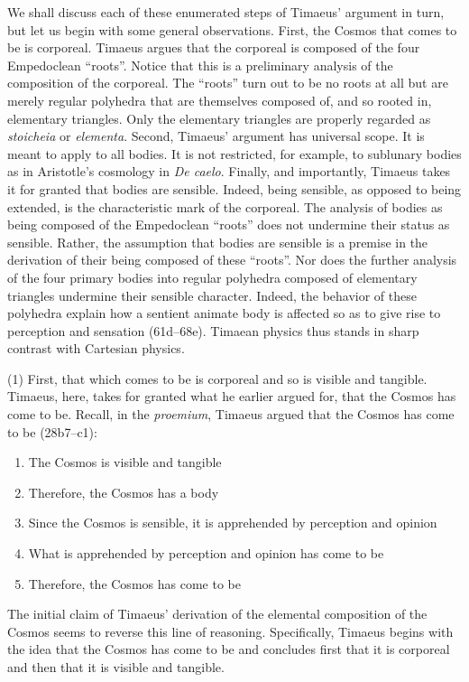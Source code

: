 We shall discuss each of these enumerated steps of Timaeus' argument in turn, but let us begin with some general observations. First, the Cosmos that comes to be is corporeal. Timaeus argues that the corporeal is composed of the four Empedoclean ``roots''. Notice that this is a preliminary analysis of the composition of the corporeal. The ``roots'' turn out to be no roots at all but are merely regular polyhedra that are themselves composed of, and so rooted in, elementary triangles. Only the elementary triangles are properly regarded as \emph{stoicheia} or \emph{elementa}. Second, Timaeus' argument has universal scope. It is meant to apply to all bodies. It is not restricted, for example, to sublunary bodies as in Aristotle's cosmology in \emph{De caelo}. Finally, and importantly, Timaeus takes it for granted that bodies are sensible. Indeed, being sensible, as opposed to being extended, is the characteristic mark of the corporeal. The analysis of bodies as being composed of the Empedoclean ``roots'' does not undermine their status as sensible. Rather, the assumption that bodies are sensible is a premise in the derivation of their being composed of these ``roots''. Nor does the further analysis of the four primary bodies into regular polyhedra composed of elementary triangles undermine their sensible character. Indeed, the behavior of these polyhedra explain how a sentient animate body is affected so as to give rise to perception and sensation (61d--68e). Timaean physics thus stands in sharp contrast with Cartesian physics.

(1) First, that which comes to be is corporeal and so is visible and tangible. Timaeus, here, takes for granted what he earlier argued for, that the Cosmos has come to be. Recall, in the \emph{proemium}, Timaeus argued that the Cosmos has come to be (28b7--c1):
\begin{enumerate}[(1)]
	\item The Cosmos is visible and tangible
	\item Therefore, the Cosmos has a body
	\item Since the Cosmos is sensible, it is apprehended by perception and opinion
	\item What is apprehended by perception and opinion has come to be
	\item Therefore, the Cosmos has come to be
\end{enumerate}
The initial claim of Timaeus' derivation of the elemental composition of the Cosmos seems to reverse this line of reasoning. Specifically, Timaeus begins with the idea that the Cosmos has come to be and concludes first that it is corporeal and then that it is visible and tangible. 

